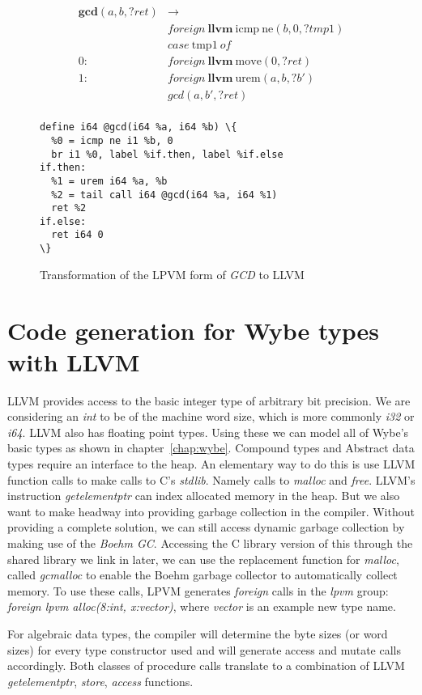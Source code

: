 \begin{figure}
    \begin{align*}
      \mathbf{gc}\mathbf{d}(a,b,?ret) & \rightarrow \\
          & foreign\ \mathbf{llvm}\ \mathrm{icmp}\ \mathrm{ne}(b,0,?tmp1) \\
          & case\ \mathrm{tmp1}\ of \\
      0:\ & foreign\ \mathbf{llvm}\ \mathrm{move}(0,?ret) \\
      1:\ & foreign\ \mathbf{llvm}\ \mathrm{urem}(a,b,?b') \\
          &  gcd(a,b',?ret) \\
    \end{align*}
\begin{Verbatim}[frame=lines,label=LLVM,labelposition=topline,framesep=4mm,fontsize=\small,commandchars=\\\{\}]
define i64 @gcd(i64 %a, i64 %b) \{
  %0 = icmp ne i1 %b, 0 
  br i1 %0, label %if.then, label %if.else
if.then:
  %1 = urem i64 %a, %b
  %2 = tail call i64 @gcd(i64 %a, i64 %1)
  ret %2
if.else:
  ret i64 0
\}
\end{Verbatim}
  \caption{Transformation of the LPVM form of \textit{GCD} to LLVM}
  \label{fig:lpvm_to_llvm}
\end{figure}

\section{Code generation for Wybe types with LLVM}
\label{sec:type_codegen}

LLVM provides access to the basic integer type of arbitrary bit precision. We
are considering an \textit{int} to be of the machine word size, which is more
commonly \textit{i32} or \textit{i64}. LLVM also has floating point
types. Using these we can model all of Wybe's basic types as shown in
chapter~\ref{chap:wybe}. Compound types and Abstract data types require an
interface to the heap. An elementary way to do this is use LLVM function calls
to make calls to C's \textit{stdlib}. Namely calls to \textit{malloc} and
\textit{free}. LLVM's instruction \textit{getelementptr} can index allocated
memory in the heap. But we also want to make headway into providing garbage
collection in the compiler. Without providing a complete solution, we can still
access dynamic garbage collection by making use of the \textit{Boehm
  GC}. Accessing the C library version of this through the shared library we
link in later, we can use the replacement function for \textit{malloc}, called
\textit{gc\textunderscore malloc} to enable the Boehm garbage collector to automatically
collect memory. To use these calls, LPVM generates \textit{foreign} calls in
the \textit{lpvm} group: \textit{foreign lpvm alloc(8:int, x:vector)}, where
\textit{vector} is an example new type name.

For algebraic data types, the compiler will determine the byte sizes (or word
sizes) for every type constructor used and will generate access and mutate
calls accordingly. Both classes of procedure calls translate to a combination
of LLVM \textit{getelementptr}, \textit{store}, \textit{access} functions. 


